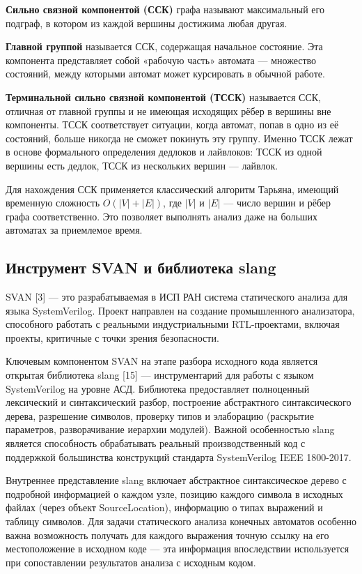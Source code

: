 \textbf{Сильно связной компонентой (ССК)} графа называют максимальный его подграф, в котором из
каждой вершины достижима любая другая.

\textbf{Главной группой} называется ССК, содержащая начальное состояние. Эта компонента
представляет собой «рабочую часть» автомата --- множество состояний, между которыми автомат
может курсировать в обычной работе.

\textbf{Терминальной сильно связной компонентой (ТССК)} называется ССК, отличная от главной
группы и не имеющая исходящих рёбер в вершины вне компоненты. ТССК соответствует ситуации,
когда автомат, попав в одно из её состояний, больше никогда не сможет покинуть эту группу.
Именно ТССК лежат в основе формального определения дедлоков и лайвлоков: ТССК из одной вершины
есть дедлок, ТССК из нескольких вершин --- лайвлок.

Для нахождения ССК применяется классический алгоритм Тарьяна, имеющий временную сложность
$O(|V| + |E|)$, где $|V|$ и $|E|$ --- число вершин и рёбер графа соответственно. Это позволяет
выполнять анализ даже на больших автоматах за приемлемое время.

\subsection{Инструмент SVAN и библиотека slang}

SVAN [3] --- это разрабатываемая в ИСП РАН система статического анализа для языка SystemVerilog.
Проект направлен на создание промышленного анализатора, способного работать с реальными
индустриальными RTL-проектами, включая проекты, критичные с точки зрения безопасности. 

Ключевым компонентом SVAN на этапе разбора исходного кода является открытая библиотека
slang [15] --- инструментарий для работы с языком SystemVerilog на уровне АСД. Библиотека
предоставляет полноценный лексический и синтаксический разбор, построение абстрактного
синтаксического дерева, разрешение символов, проверку типов и элаборацию (раскрытие параметров,
разворачивание иерархии модулей). Важной особенностью slang является способность обрабатывать
реальный производственный код с поддержкой большинства конструкций стандарта SystemVerilog IEEE
1800-2017.

Внутреннее представление slang включает абстрактное синтаксическое дерево с подробной информацией
о каждом узле, позицию каждого символа в исходных файлах (через объект SourceLocation),
информацию о типах выражений и таблицу символов. Для задачи статического анализа конечных
автоматов особенно важна возможность получать для каждого выражения точную ссылку на его
местоположение в исходном коде --- эта информация впоследствии используется при сопоставлении
результатов анализа с исходным кодом.

